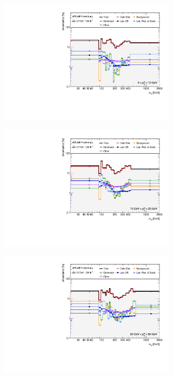 \begin{figure}[hp]
    \centering
    \begin{subfigure}{.49\textwidth}\centering\includegraphics[width = 0.95\textwidth]{Figures/m4l/Systematics/Unfolded/UnfoldedSys_M4lvPt4lbin_Stack_Paper0.pdf}\end{subfigure}
    \begin{subfigure}{.49\textwidth}\centering\includegraphics[width = 0.95\textwidth]{Figures/m4l/Systematics/Unfolded/UnfoldedSys_M4lvPt4lbin_Stack_Paper1.pdf}\end{subfigure}
    \begin{subfigure}{.49\textwidth}\centering\includegraphics[width = 0.95\textwidth]{Figures/m4l/Systematics/Unfolded/UnfoldedSys_M4lvPt4lbin_Stack_Paper2.pdf}\end{subfigure}

\end{figure}
